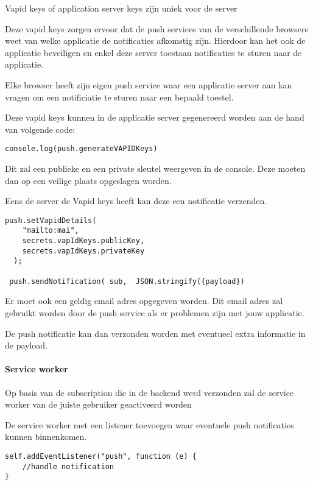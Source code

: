 			Vapid keys of application server keys zijn uniek voor de server
			
			Deze vapid keys zorgen ervoor dat de push services van de verschillende browsers weet van welke applicatie de notificaties afkomstig zijn. Hierdoor kan het ook de applicatie beveiligen en enkel deze server toestaan notificaties te sturen naar de applicatie.
			
			Elke browser heeft zijn eigen push service waar een applicatie server aan kan vragen om een notificiatie te sturen naar een bepaald toestel.
			
		
			Deze vapid keys kunnen in de applicatie server gegenereerd worden aan de hand van volgende code:
			
\begin{lstlisting}
console.log(push.generateVAPIDKeys)
\end{lstlisting}

			Dit zal een publieke en een private sleutel weergeven in de console. Deze moeten dan op een veilige plaats opgeslagen worden.
			
			Eens de server de Vapid keys heeft kan deze een notificatie verzenden.
			
\begin{lstlisting}
push.setVapidDetails(
    "mailto:mai",
    secrets.vapIdKeys.publicKey,
    secrets.vapIdKeys.privateKey
  );
  
 push.sendNotification( sub,  JSON.stringify({payload})
\end{lstlisting}

			Er moet ook een geldig email adres opgegeven worden. Dit email adres zal gebruikt worden door de push service als er problemen zijn met jouw applicatie.
			
			De push notificatie kan dan verzonden worden met eventueel extra informatie in de payload.
			
		\paragraph{Service worker}
		
			Op basis van de subscription die in de backend werd verzonden zal de service worker van de juiste gebruiker geactiveerd worden
			
			De service worker met een listener toevoegen waar eventuele push notificaties kunnen binnenkomen.
			
\begin{lstlisting}
self.addEventListener("push", function (e) {
	//handle notification
}
\end{lstlisting}
			
